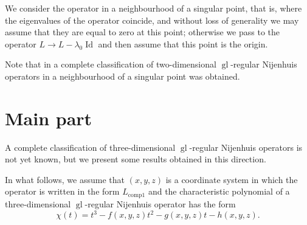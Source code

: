 \documentclass[12pt]{article}
\theoremstyle{plain}
\begin{document}
We consider the operator in a neighbourhood of a singular point, that is, where the eigenvalues of the operator coincide, and without loss of generality we may assume that they are equal to zero at this point; otherwise we pass to the operator $L \to L - \lambda_0 \operatorname{Id}$ and then assume that this point is the origin.

Note that in \cite{bolsinov2024nijenhuisNGIII} a complete classification of two-dimensional $\operatorname{gl}$-regular Nijenhuis operators in a neighbourhood of a singular point was obtained.


\section*{Main part}

A complete classification of three-dimensional $\operatorname{gl}$-regular Nijenhuis operators is not yet known, but we present some results obtained in this direction.

In what follows, we assume that $(x,y,z)$ is a coordinate system in which the operator is written in the form $L_{\operatorname{comp1}}$ and the characteristic polynomial of a three-dimensional $\operatorname{gl}$-regular Nijenhuis operator has the form
\begin{equation}\label{eq: char pol}
    \chi(t) = t^3 - f(x,y,z)t^2 - g(x,y,z)t - h(x,y,z).
\end{equation}
\end{document}
